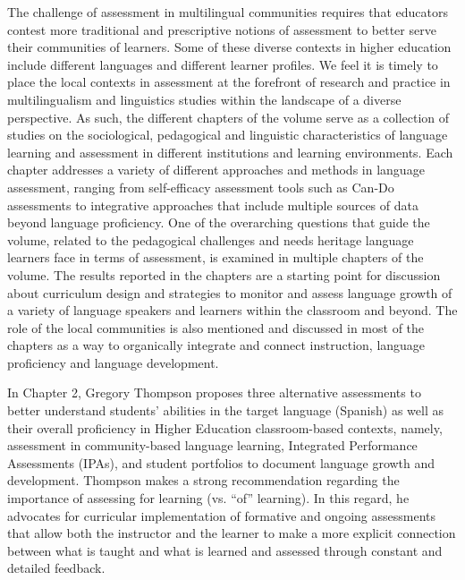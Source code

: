 \documentclass[output=paper]{langscibook}
\begin{document}
The challenge of assessment in multilingual communities requires that educators contest more traditional and prescriptive notions of assessment to better serve their communities of learners. Some of these diverse contexts in higher education include different languages and different learner profiles. We feel it is timely to place the local contexts in assessment at the forefront of research and practice in multilingualism and linguistics studies within the landscape of a diverse perspective. As such, the different chapters of the volume serve as a collection of studies on the sociological, pedagogical and linguistic characteristics of language learning and assessment in different institutions and learning environments. Each chapter addresses a variety of different approaches and methods in language assessment, ranging from self-efficacy assessment tools such as Can-Do assessments to integrative approaches that include multiple sources of data beyond language proficiency. One of the overarching questions that guide the volume, related to the pedagogical challenges and needs heritage language learners face in terms of assessment, is examined in multiple chapters of the volume. The results reported in the chapters are a starting point for discussion about curriculum design and strategies to monitor and assess language growth of a variety of language speakers and learners within the classroom and beyond. The role of the local communities is also mentioned and discussed in most of the chapters as a way to organically integrate and connect instruction, language proficiency and language development.



 In Chapter 2, Gregory Thompson proposes three alternative assessments to better understand students’ abilities in the target language (Spanish) as well as their overall proficiency in Higher Education classroom-based contexts, namely, assessment in community-based language learning, Integrated Performance Assessments (IPAs), and student portfolios to document language growth and development. Thompson makes a strong recommendation regarding the importance of assessing for learning (vs. “of” learning). In this regard, he advocates for curricular implementation of formative and ongoing assessments that allow both the instructor and the learner to make a more explicit connection between what is taught and what is learned and assessed through constant and detailed feedback.
\end{document}

